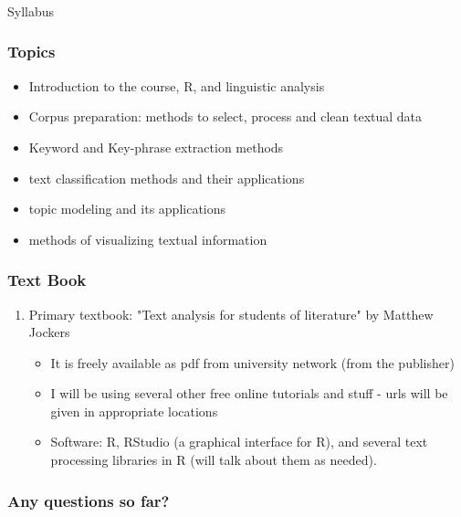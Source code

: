 \documentclass{beamer}
\begin{document}
\begin{frame}
\frametitle{}
\begin{center}
Syllabus
\end{center}
\end{frame}

\begin{frame}
\frametitle{Topics} 
\begin{itemize}
\item Introduction to the course, R, and linguistic analysis
\item Corpus preparation: methods to select, process and clean textual data
\item Keyword and Key-phrase extraction methods
\item text classification methods and their applications
\item topic modeling and its applications
\item methods of visualizing textual information
\end{itemize}
\end{frame}

\begin{frame} 
\frametitle{Text Book}
\begin{enumerate}
\item Primary textbook: "Text analysis for students of literature" by Matthew Jockers
\begin{itemize}
\item It is freely available as pdf from university network (from the publisher)
\item I will be using several other free online tutorials and stuff - urls will be given in appropriate locations
\item Software: R, RStudio (a graphical interface for R), and several text processing libraries in R (will talk about them as needed).
\end{itemize}
\end{enumerate}
\end{frame}

\begin{frame}
\frametitle{Any questions so far?}
\end{frame}
\end{document}
